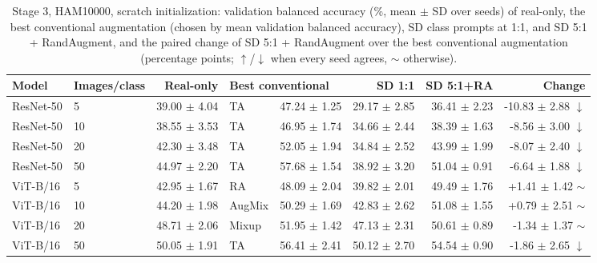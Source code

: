\begin{table}[H]
\centering
\small
\setlength{\tabcolsep}{4pt}
\caption{Stage 3, HAM10000, scratch initialization: validation balanced accuracy (\%, mean $\pm$ SD over seeds) of real-only, the best conventional augmentation (chosen by mean validation balanced accuracy), SD class prompts at 1:1, and SD 5:1 + RandAugment, and the paired change of SD 5:1 + RandAugment over the best conventional augmentation (percentage points; $\uparrow$/$\downarrow$ when every seed agrees, $\sim$ otherwise).}
\label{tab:stage3-ham10000-scores-scratch}
\begin{tabular}{llrlrrrr}
\toprule
Model & Images/class & Real-only & \multicolumn{2}{l}{Best conventional} & SD 1:1 & SD 5:1+RA & Change \\
\midrule
ResNet-50 & 5 & 39.00 $\pm$ 4.04 & TA & 47.24 $\pm$ 1.25 & 29.17 $\pm$ 2.85 & 36.41 $\pm$ 2.23 & -10.83 $\pm$ 2.88 $\downarrow$ \\
ResNet-50 & 10 & 38.55 $\pm$ 3.53 & TA & 46.95 $\pm$ 1.74 & 34.66 $\pm$ 2.44 & 38.39 $\pm$ 1.63 & -8.56 $\pm$ 3.00 $\downarrow$ \\
ResNet-50 & 20 & 42.30 $\pm$ 3.48 & TA & 52.05 $\pm$ 1.94 & 34.84 $\pm$ 2.52 & 43.99 $\pm$ 1.99 & -8.07 $\pm$ 2.40 $\downarrow$ \\
ResNet-50 & 50 & 44.97 $\pm$ 2.20 & TA & 57.68 $\pm$ 1.54 & 38.92 $\pm$ 3.20 & 51.04 $\pm$ 0.91 & -6.64 $\pm$ 1.88 $\downarrow$ \\
ViT-B/16 & 5 & 42.95 $\pm$ 1.67 & RA & 48.09 $\pm$ 2.04 & 39.82 $\pm$ 2.01 & 49.49 $\pm$ 1.76 & +1.41 $\pm$ 1.42 $\sim$ \\
ViT-B/16 & 10 & 44.20 $\pm$ 1.98 & AugMix & 50.29 $\pm$ 1.69 & 42.83 $\pm$ 2.62 & 51.08 $\pm$ 1.55 & +0.79 $\pm$ 2.51 $\sim$ \\
ViT-B/16 & 20 & 48.71 $\pm$ 2.06 & Mixup & 51.95 $\pm$ 1.42 & 47.13 $\pm$ 2.31 & 50.61 $\pm$ 0.89 & -1.34 $\pm$ 1.37 $\sim$ \\
ViT-B/16 & 50 & 50.05 $\pm$ 1.91 & TA & 56.41 $\pm$ 2.41 & 50.12 $\pm$ 2.70 & 54.54 $\pm$ 0.90 & -1.86 $\pm$ 2.65 $\downarrow$ \\
\bottomrule
\end{tabular}
\end{table}
